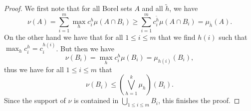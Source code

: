 \begin{proof}
	We first note that for all Borel sets $ A $ and all $ \tilde{h} $, we have
	\begin{equation*}
		\nu ( A ) 
		=
		\sum_{ i = 1 }^{ m }
		\max_{ h }	
		c_{ i }^{ h }
		\mu ( A \cap B_{ i } ) 
		\geq
		\sum_{ i = 1 }^{ m }
		c_{ i }^{ \tilde{ h } }
		\mu ( A \cap B_{ i } )
		=
		\mu_{ \tilde{ h } } ( A ).
	\end{equation*}
	On the other hand we have that for all $ 1 \leq i \leq m $ that we find $ h( i ) $ such that
	$ \max_{ h } c_{ i }^{ h } = c_{ i }^{ h( i ) } $.
	But then we have 
	\begin{equation*}
		\nu ( B_{ i } ) = \max_{ h } c_{ i }^{ h } \mu ( B_{ i } )
		= \mu_{ h ( i ) } ( B_{ i } ),
	\end{equation*}
	thus we have for all $ 1 \leq i \leq m $ that
	\begin{equation*}
		\nu ( B_{ i } ) 
		\leq
		\left(
		\bigvee_{ h = 1 }^{ k }
		\mu_{ h }
		\right) ( B_{ i } ).
	\end{equation*}
	Since the support of $ \nu $ is contained in $ \bigcup_{ 1 \leq i \leq m } B_{ i } $, this finishes the proof.
\end{proof}